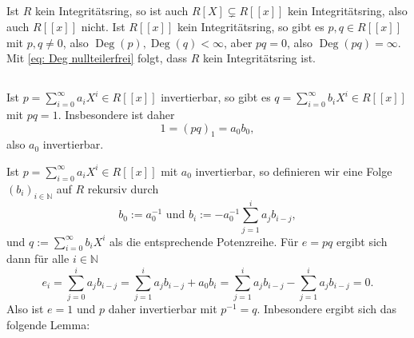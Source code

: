 \documentclass[a4paper,10pt]{article}
\theoremstyle{definition}
\newcommand{\N}{\mathbb{N}}
\newcommand{\Deg}{\operatorname{Deg}}
\begin{document}
\subsection{}
Ist $R$ kein Integritätsring, so ist auch $R[X] \subsetneq R[\![x]\!]$ kein Integritätsring, also auch $R[\![x]\!]$ nicht. Ist $R[\![x]\!]$ kein Integritätsring, so gibt es $p, q \in R[\![x]\!]$ mit $p,q \neq 0$, also $\Deg(p), \Deg(q) < \infty$, aber $pq = 0$, also $\Deg(pq) = \infty$. Mit \eqref{eq: Deg nullteilerfrei} folgt, dass $R$ kein Integritätsring ist.


\subsection{}
Ist $p = \sum_{i=0}^\infty a_i X^i \in R[\![x]\!]$ invertierbar, so gibt es $q = \sum_{i=0}^\infty b_i X^i \in R[\![x]\!]$ mit $pq = 1$. Insbesondere ist daher
\[
 1 = (pq)_1 = a_0 b_0,
\]
also $a_0$ invertierbar.

Ist $p = \sum_{i=0}^\infty a_i X^i \in R[\![x]\!]$ mit $a_0$ invertierbar, so definieren wir eine Folge $(b_i)_{i \in \N}$ auf $R$ rekursiv durch
\[
 b_0 := a_0^{-1} \text{ und } b_i := -a_0^{-1} \sum_{j=1}^i a_j b_{i-j},
\]
und $q := \sum_{i=0}^\infty b_i X^i$ als die entsprechende Potenzreihe. Für $e = pq$ ergibt sich dann für alle $i \in \N$
\[
 e_i
 = \sum_{j=0}^i a_j b_{i-j}
 = \sum_{j=1}^i a_j b_{i-j} + a_0 b_i
 = \sum_{j=1}^i a_j b_{i-j} - \sum_{j=1}^i a_j b_{i-j}
 = 0.
\]
Also ist $e = 1$ und $p$ daher invertierbar mit $p^{-1} = q$. Inbesondere ergibt sich das folgende Lemma:
\end{document}
